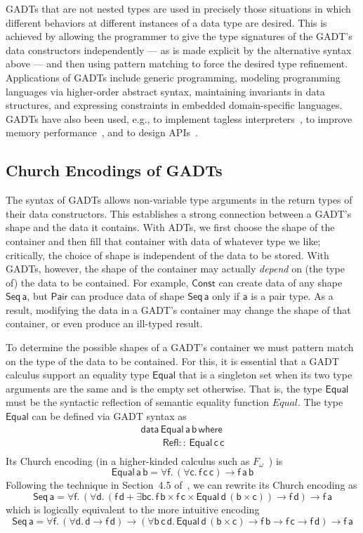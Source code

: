 \documentclass[submission,copyright,creativecommons]{eptcs}
\begin{document}
GADTs that are not nested types are used in precisely those situations
in which different behaviors at different instances of a data type are
desired. This is achieved by allowing the programmer to give the type
signatures of the GADT's data constructors independently --- as is
made explicit by the alternative syntax above --- and then using
pattern matching to force the desired type refinement. Applications of
GADTs include generic programming, modeling programming languages via
higher-order abstract syntax, maintaining invariants in data
structures, and expressing constraints in embedded domain-specific
languages. GADTs have also been used, e.g., to implement tagless
interpreters~\cite{pl04,pr06,pvww06}, to improve memory
performance~\cite{min15}, and to design APIs~\cite{pen20}.

\subsection{Church Encodings of GADTs}\label{sec:CEs}

The syntax of GADTs allows non-variable type arguments in the return
types of their data constructors. This establishes a strong connection
between a GADT's shape and the data it contains. With ADTs, we first
choose the shape of the container and then fill that container with
data of whatever type we like; critically, the choice of shape is
independent of the data to be stored. With GADTs, however, the shape
of the container may actually {\em depend} on (the type of) the data
to be contained. For example, $\mathsf{Const}$ can create data of any
shape $\mathsf{Seq\,a}$, but $\mathsf{Pair}$ can produce data of shape
$\mathsf{Seq\,a}$ only if $\mathsf{a}$ is a pair type. As a result,
modifying the data in a GADT's container may change the shape of that
container, or even produce an ill-typed result.

To determine the possible shapes of a GADT's container we must
pattern match on the type of the data to be contained. For this, it is
essential that a GADT calculus support an equality type
$\mathsf{Equal}$ that is a singleton set when its two type arguments
are the same and is the empty set otherwise. That is, the type
$\mathsf{Equal}$ must be the syntactic reflection of semantic equality
function $\mathit{Equal}$. The type $\mathsf{Equal}$ can be
defined via GADT syntax as
\[\begin{array}{l}
\mathsf{data\, Equal\,a\,b\,where}\\
\mathsf{\;\;\;\;\;\;\;\;Refl ::\, Equal\,c\,c}\\
\end{array}\]
\noindent
Its Church encoding (in a higher-kinded calculus such as
$F_\omega$~\cite{atk12}) is
\[\mathsf{Equal\,a\,b} = \mathsf{\forall f.\, (\forall c.\,
  f\,c\,c) \to f\,a\,b}\] Following the technique in Section~4.5
of~\cite{atk12}, we can rewrite its Church encoding as
\[\mathsf{Seq\,a} = \mathsf{\forall f.\,(\forall d. \,(f\,d + \exists b
  c.\, f\, b \times f \,c \times \mathsf{Equal}\, d \,(b \times c))
  \to f \,d) \to f\, a}\]
which is logically equivalent to the more intuitive encoding
\[\mathsf{Seq\,a} = \mathsf{\forall f.\, (\forall d.\,d \to f\, d)
  \to (\forall b\,c\,d.\,Equal\,d\,(b\times c) \to f\,b \to f\,c \to
  f\,d) \to f\,a}\]
\end{document}
